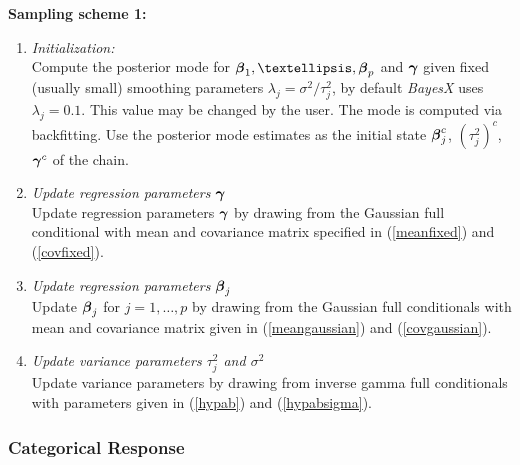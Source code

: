 \documentclass[11pt,a4paper,twoside]{bayesxarticle}
\begin{document}
{\bf Sampling scheme 1:}
\begin{enumerate}
\item {\em Initialization:} \\
Compute the posterior mode for $\betavec_1,\dots,\betavec_p$ and $\boldsymbol{\gamma}$
given fixed (usually small) smoothing parameters $\lambda_j =
\sigma^2/\tau^2_j$, by default {\em BayesX} uses $\lambda_j = 0.1$.
This value may be changed by the user. The mode is computed via
backfitting. Use the posterior mode estimates as the initial state
$\boldsymbol{\beta}_j^c$, $(\tau_j^2)^c$, $\boldsymbol{\gamma}^c$ of the chain.
\item {\em Update regression parameters $\boldsymbol{\gamma}$} \\
Update regression parameters $\boldsymbol{\gamma}$ by drawing from the Gaussian
full conditional with mean and covariance matrix specified in
(\ref{meanfixed}) and (\ref{covfixed}).
\item {\em Update regression parameters $\boldsymbol{\beta}_j$} \\
Update $\boldsymbol{\beta}_j$ for $j=1,\dots,p$ by drawing from the Gaussian
full conditionals with mean and covariance matrix given in
(\ref{meangaussian}) and (\ref{covgaussian}).
\item {\em Update variance parameters $\tau^2_j$ and $\sigma^2$} \\
Update variance parameters by drawing from inverse gamma full
conditionals with parameters given in (\ref{hypab}) and
(\ref{hypabsigma}).
\end{enumerate}

\subsubsection{Categorical Response}
\label{mulitcategoricalresp} 
\end{document}
